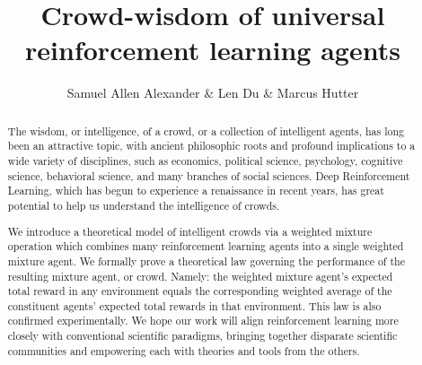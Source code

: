 \documentclass{article}
\begin{document}
\title{ Crowd-wisdom of universal reinforcement learning agents }
\author{Samuel Allen Alexander \& Len Du \& Marcus Hutter}


\maketitle

\begin{abstract}
The wisdom, or intelligence, of a crowd, or a collection of intelligent agents, has long been an attractive topic, with ancient philosophic roots and profound implications to a wide variety of disciplines, such as economics, political science, psychology, cognitive science, behavioral science, and many branches of social sciences.
Deep Reinforcement Learning, which has begun to experience a renaissance in recent years,
has great potential to help us understand the intelligence of crowds.

We introduce a theoretical model of intelligent crowds via
a weighted mixture operation which combines many reinforcement learning agents
into a single weighted mixture agent.
We formally prove a theoretical law governing the performance of the resulting
mixture agent, or crowd.
Namely: the weighted mixture agent's expected total reward
in any environment equals the corresponding weighted average
of the constituent agents' expected total rewards in that environment.
This law is also confirmed experimentally.
We hope our work will align reinforcement learning more closely
with conventional scientific paradigms, bringing together disparate
scientific communities and empowering each with theories and tools from
the others.
\end{abstract}

%
%
\end{document}
